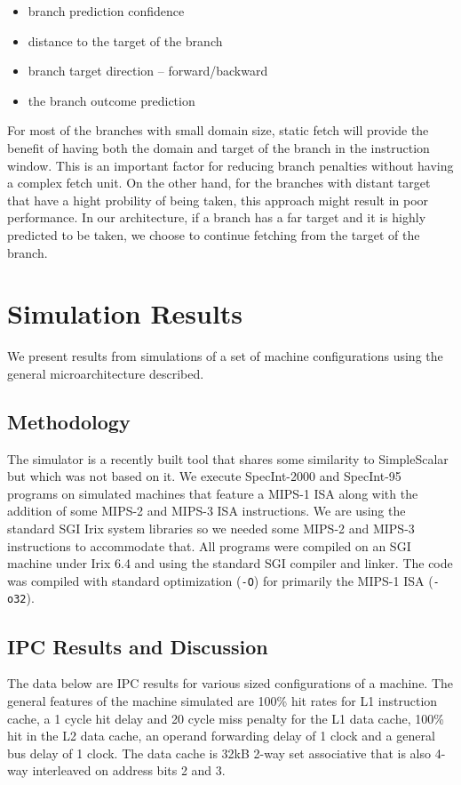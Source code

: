 \documentclass[10pt,dvips]{article}
\begin{document}
\begin{itemize}
\item{branch prediction confidence}
\item{distance to the target of the branch}
\item{branch target direction -- forward/backward}
\item{the branch outcome prediction}
\end{itemize}   

For most of the branches with small domain size, static fetch will
provide the benefit of having both the domain and target of the branch 
in the instruction window.  This is an important factor for reducing
branch penalties without having a complex fetch unit.  On the other
hand, for the branches with distant target that have a hight 
probility of being taken, this approach might result in poor performance.
In our architecture, if a branch has a far target and it is highly predicted
to be taken, we choose to continue fetching from the target of the branch.

%
\section{Simulation Results}
%
We present results from simulations of a set of machine configurations
using the general microarchitecture described.
%
\subsection{Methodology}
%
The simulator is a recently built tool that shares some similarity
to SimpleScalar \cite{Austin97} but which was not based on it.
We execute
SpecInt-2000 and SpecInt-95 programs on simulated machines
that feature a MIPS-1 ISA along with the addition of some MIPS-2 and
MIPS-3 ISA instructions.  We are using the standard SGI Irix system
libraries so we needed some MIPS-2 and MIPS-3 instructions to accommodate
that.  All programs were compiled on an SGI machine under Irix 6.4 and
using the standard SGI compiler and linker.  The code was compiled with
standard optimization ({\tt -O}) for primarily the MIPS-1 ISA ({\tt -o32}).
%
\subsection{IPC Results and Discussion}
%
The data below are IPC results for various sized configurations of
a machine.  The general features of
the machine simulated are 100\% hit rates for L1 instruction cache,
a 1 cycle hit delay and 20 cycle miss penalty for the L1 data cache,
100\% hit in the L2 data cache, an operand forwarding delay of 1 clock
and a general bus delay of 1 clock.  The data cache is 32kB 2-way
set associative that is also 4-way interleaved on address bits 2 and 3.
\end{document}
